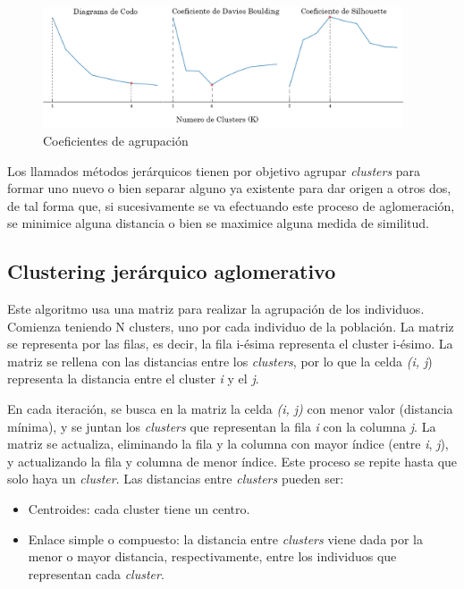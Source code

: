 	\begin{figure}[!h]
		\centering
		\includegraphics[width=0.95\textwidth]{images/chapter_2/ap_nosup_diagramas}
		\caption{Coeficientes de agrupación}
		\label{fig:coeficientes}
	\end{figure}
	


	Los llamados métodos jerárquicos \cite{ackermann2014analysis} tienen por objetivo agrupar \textit{clusters} para formar uno nuevo o bien separar alguno ya existente para dar origen a otros dos, de tal forma que, si sucesivamente se va efectuando este proceso de aglomeración, se minimice alguna distancia o bien se maximice alguna medida de similitud.

	\subsection{Clustering jerárquico aglomerativo}

		Este algoritmo usa una matriz para realizar la agrupación de los individuos. Comienza teniendo N clusters, uno por cada individuo de la población. La matriz se representa por las filas, es decir, la fila i-ésima representa el cluster i-ésimo. La matriz se rellena con las distancias entre los \textit{clusters}, por lo que la celda \textit{(i, j}) representa la distancia entre el cluster \textit{i} y el \textit{j}.  
		
		En cada iteración, se busca en la matriz la celda \textit{(i, j)} con menor valor (distancia mínima), y se juntan los \textit{clusters} que representan la fila \textit{i} con la columna \textit{j}. La matriz se actualiza, eliminando la fila y la columna con mayor índice (entre \textit{i}, \textit{j}), y actualizando la fila y columna de menor índice. Este proceso se repite hasta que solo haya un \textit{cluster}. Las distancias entre \textit{clusters} pueden ser:
		\begin{itemize}
		\vspace{-0.25cm}
		\item Centroides: cada cluster tiene un centro.
		\vspace{-0.25cm}
		\item Enlace simple o compuesto: la distancia entre \textit{clusters} viene dada por la menor o mayor distancia, respectivamente, entre los individuos que representan cada \textit{cluster}.
		\vspace{-0.30cm}
		\end{itemize}



